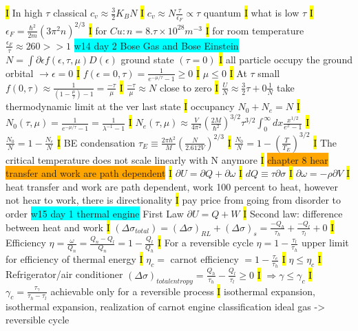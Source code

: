 \documentclass[fontsize=4pt]{scrartcl}
\begin{document}
\hl{I}
In high $\tau$ classical $c_v \approx \frac{3}{2} K_B N$
\hl{I}
$c_v \approx N \frac{\tau}{\epsilon_F} \propto \tau$ quantum
\hl{I}
what is low $\tau$
\hl{I}
$\epsilon_F = \frac{\hbar^2}{2m}(3\pi^2 n)^{2/3}$
\hl{I}
for $Cu: n = 8.\tau \times 10^{28} m^{-3}$
\hl{I}
for room temperature $\frac{\epsilon_F}{\tau} \approx 260 >> 1$
\colorbox{Cyan}{w14 day 2 Bose Gas and Bose Einstein}
$N = \int \partial \epsilon f(\epsilon, \tau, \mu) D(\epsilon)$
ground state $(\tau = 0)$
\hl{I}
all particle occupy the ground orbital $\rightarrow \epsilon = 0$
\hl{I}
$f(\epsilon = 0, \tau) = \frac{1}{e^{-\mu / \tau} -1} \geq 0$
\hl{I}
$\mu \leq 0$
\hl{I}
At $\tau$ small $f(0,\tau) \approx \frac{1}{(1-\frac{\mu}{\tau})-1}=\frac{-\tau}{\mu}$
\hl{I}
$\frac{-\tau}{\mu} \approx N$ close to zero
\hl{I}
$\frac{U}{N} \approx \frac{3}{2}\tau + 0 \frac{1}{N}$ take thermodynamic limit at the ver last state
\hl{I}
occupancy $N_0 + N_e = N$
\hl{I}
$N_0 (\tau,\mu) = \frac{1}{e^{-\mu / \tau} -1} = \frac{1}{\lambda^{-1} -1}$
\hl{I}
$N_e (\tau,\mu) \approx \frac{V}{4\pi^2} (\frac{2M}{\hbar^2})^{3/2} \tau^{3/2} \int_{0}^{\infty} dx \frac{x^{1/2}}{e^x - 1} $
\hl{I}
$\frac{N_0}{N} = 1 - \frac{N_e}{N}$
\hl{I}
BE condensation
$\tau_{E} \equiv \frac{2 \pi \hbar^2}{M}(\frac{N}{2.612 V})^{2/3}$
\hl{I}
$\frac{N_0}{N}=1-(\frac{T}{T_E})^{3/2}$
\hl{I}
The critical temperature does not scale linearly with N anymore
\hl{I}
\colorbox{Orange}{chapter 8 hear transfer and work are path dependent}
\hl{I}
$\partial U  = \partial Q + \partial \omega$
\hl{I}
$dQ \equiv \tau \partial \sigma$
\hl{I}
$\partial \omega = -\rho \partial V$
\hl{I}
heat transfer and work are path dependent, work 100 percent to heat, however not hear to work, there is directionality
\hl{I}
pay price from going from disorder to order
\colorbox{Cyan}{w15 day 1 thermal engine}
First Law $\partial U = Q + W$
\hl{I}
Second law: difference between heat and work
\hl{I}
$(\Delta \sigma_{total}) = (\Delta \sigma)_{RL} + (\Delta \sigma)_s = \frac{-Q_h}{\tau_h} + \frac{-Q_l}{\tau_l} + 0 $
\hl{I}
Efficiency $\eta = \frac{\omega}{Q_n} = \frac{Q_n - Q_l}{Q_n} = 1 - \frac{Q_l}{Q_h}$
\hl{I}
For a reversible cycle $\eta = 1-\frac{\tau_l}{\tau_h}$ upper limit for efficiency of thermal energy
\hl{I}
$\eta_c = $ carnot efficiency $ =1 - \frac{\tau_e}{\tau_h}$
\hl{I}
$\eta \leq \eta_c$
\hl{I}
Refrigerator/air conditioner
$(\Delta \sigma)_{total entropy} = \frac{Q_h}{\tau_h} - \frac{Q_l}{\tau_l} \geq 0 $
\hl{I}
$\Rightarrow \gamma \leq \gamma_c$
\hl{I}
$\gamma_c = \frac{\tau_{\gamma}}{\tau_{h}-\tau_{l}}$ achievable only for a reversible process
\hl{I}
isothermal expansion, isothermal expansion, realization of carnot engine classification ideal gas -> reversible cycle
\end{document}
